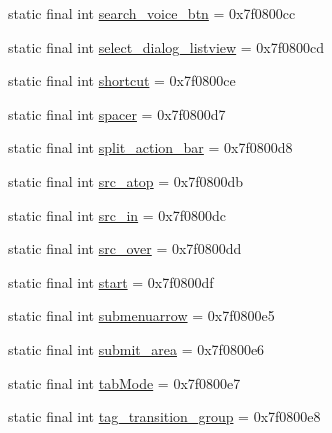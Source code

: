 \begin{DoxyCompactItemize}
\item 
static final int \mbox{\hyperlink{classandroid_1_1support_1_1v7_1_1appcompat_1_1_r_1_1id_a7d142ddff5b4fc44eccc940e9637cc13}{search\+\_\+voice\+\_\+btn}} = 0x7f0800cc
\item 
static final int \mbox{\hyperlink{classandroid_1_1support_1_1v7_1_1appcompat_1_1_r_1_1id_a770539389d1ac0acea54ed3fa5bd4678}{select\+\_\+dialog\+\_\+listview}} = 0x7f0800cd
\item 
static final int \mbox{\hyperlink{classandroid_1_1support_1_1v7_1_1appcompat_1_1_r_1_1id_a5e6c07eab32d329b1534a1746d1beb00}{shortcut}} = 0x7f0800ce
\item 
static final int \mbox{\hyperlink{classandroid_1_1support_1_1v7_1_1appcompat_1_1_r_1_1id_af3d077d30ddf6ee7ab53a8fd12b9066d}{spacer}} = 0x7f0800d7
\item 
static final int \mbox{\hyperlink{classandroid_1_1support_1_1v7_1_1appcompat_1_1_r_1_1id_a741149a72fc9b9aaf02b0346115459e2}{split\+\_\+action\+\_\+bar}} = 0x7f0800d8
\item 
static final int \mbox{\hyperlink{classandroid_1_1support_1_1v7_1_1appcompat_1_1_r_1_1id_ab3834f6ee23ff8baa7614ca68366bf1f}{src\+\_\+atop}} = 0x7f0800db
\item 
static final int \mbox{\hyperlink{classandroid_1_1support_1_1v7_1_1appcompat_1_1_r_1_1id_a0302dbca2cbbbe0e6d36f6332939c370}{src\+\_\+in}} = 0x7f0800dc
\item 
static final int \mbox{\hyperlink{classandroid_1_1support_1_1v7_1_1appcompat_1_1_r_1_1id_a8e4a43230fb4b6e5ccb4a6d151bfab22}{src\+\_\+over}} = 0x7f0800dd
\item 
static final int \mbox{\hyperlink{classandroid_1_1support_1_1v7_1_1appcompat_1_1_r_1_1id_ac229029dd39474a212819b21d525af76}{start}} = 0x7f0800df
\item 
static final int \mbox{\hyperlink{classandroid_1_1support_1_1v7_1_1appcompat_1_1_r_1_1id_a4af9872688d34e2e585113cf9f31968e}{submenuarrow}} = 0x7f0800e5
\item 
static final int \mbox{\hyperlink{classandroid_1_1support_1_1v7_1_1appcompat_1_1_r_1_1id_a3ba0b5cb29db70be085cc78170b1020e}{submit\+\_\+area}} = 0x7f0800e6
\item 
static final int \mbox{\hyperlink{classandroid_1_1support_1_1v7_1_1appcompat_1_1_r_1_1id_a9f4b211ddf6dcd1ba76c5031f318dfca}{tab\+Mode}} = 0x7f0800e7
\item 
static final int \mbox{\hyperlink{classandroid_1_1support_1_1v7_1_1appcompat_1_1_r_1_1id_ab05db4df9a1936b8c66bba8d63da15a4}{tag\+\_\+transition\+\_\+group}} = 0x7f0800e8

\end{DoxyCompactItemize}
